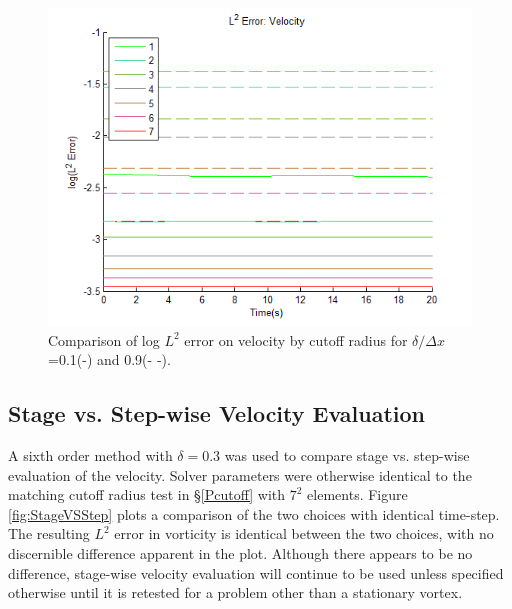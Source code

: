 \documentclass[letterpaper,12pt]{report}
\begin{document}
\begin{figure}
\centering
\includegraphics[width=1\textwidth]{CutoffL2.PNG}
\caption{\label{fig:CutoffL2}Comparison of log $L^2$ error on velocity by cutoff radius for $\delta/\Delta x$=0.1(-) and 0.9(- -).}
\end{figure}
%
\subsection{Stage vs. Step-wise Velocity Evaluation}
A sixth order method with $\delta=0.3$ was used to compare stage vs. step-wise evaluation of the velocity. Solver parameters were otherwise identical to the matching cutoff radius test in \S\ref{Pcutoff} with $7^2$ elements. Figure \ref{fig:StageVSStep} plots a comparison of the two choices with identical time-step. The resulting $L^2$ error in vorticity is identical between the two choices, with no discernible difference apparent in the plot. Although there appears to be no difference, stage-wise velocity evaluation will continue to be used unless specified otherwise until it is retested for a problem other than a stationary vortex.
\end{document}

